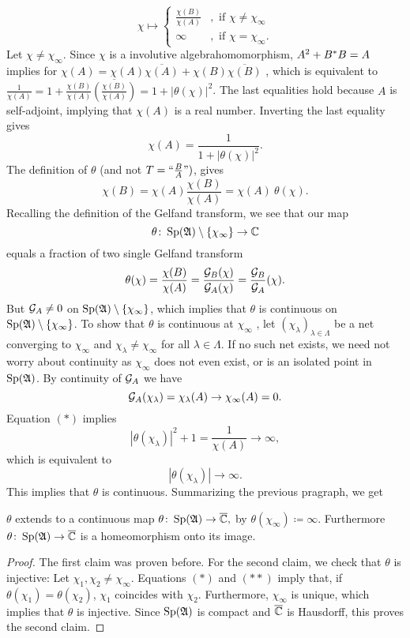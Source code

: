  \[
 \chi \mapsto 
  \begin{cases}
    \frac{\chi(B)}{\chi(A)} &, \text{ if }\chi \neq \chi_\infty\\
    \infty &, \text{ if } \chi = \chi_\infty.
    \end{cases}
 \]
 Let $\chi \neq \chi_\infty$. Since $\chi$ is a involutive algebrahomomorphism,
 $A^2 + B^{*} B = A$ implies for
   $\chi(A) = \chi(A) \overline{\chi(A)} + \chi(B) \overline{\chi(B)} $
, which is equivalent to  
  $ \frac{1}{\chi(A)} = 1 + \frac{\chi(B)}{\chi(A)} 
  \overline{\left( \frac{\chi(B)}{\chi(A)} \right)} = 1 + | \theta(\chi)|^2$.
 The last equalities hold because $A$ is self-adjoint, implying that $\chi(A)$ is a real number.
 Inverting the last equality gives
\[
 \chi(A) = \frac{1}{1 + |\theta (\chi)|^2} \tag{$\ast$}.
\]
The definition of $\theta$ (and not  $T = 
`` \frac{B}{A} ")$, gives
\[
 \chi(B) = \chi(A) \frac{\chi(B)}{\chi(A)}= \chi(A)~ \theta(\chi) 
 \tag{$\ast \ast$}.
\]
Recalling the definition of the Gelfand transform, we see that our map
\[
 \theta \colon \operatorname{Sp}(\mathfrak{A}) \setminus \left\lbrace\chi_\infty\right\rbrace \to \mathbb{C}
\]
equals a fraction of two single Gelfand transform
\[
 \theta(\chi) = \frac{\chi(B)}{\chi(A)} = \frac{\mathcal{G}_B (\chi)}{\mathcal{G}_A (\chi)}=
 \frac{\mathcal{G}_B}{\mathcal{G}_A}(\chi).
\]
But $\mathcal{G}_A \neq 0$ on $\operatorname{Sp}(\mathfrak{A}) \setminus \left\lbrace\chi_\infty\right\rbrace$, which implies
that $\theta$ is continuous on $\operatorname{Sp}(\mathfrak{A}) \setminus \left\lbrace\chi_\infty\right\rbrace$. 
To show that $\theta$ is continuous at $\chi_\infty$
, let $ \left( \chi_\lambda \right) 
_{\lambda \in \Lambda}$ be a net converging to $\chi_\infty$ and 
$\chi_\lambda \neq \chi_\infty$ for all $\lambda \in \Lambda$. If 
no such net exists, we need not worry about continuity as $\chi_\infty$
does not even exist, or is an isolated point in $\operatorname{Sp}(\mathfrak{A})$.
By continuity of $\mathcal{G}_A$ we have
\[
 \mathcal{G}_A (\chi_\lambda) = \chi_\lambda (A) \to \chi_\infty (A) = 0.
\]
Equation $(\ast)$ implies
\[
 | \theta( \chi_\lambda ) | ^2  + 1 = \frac{1}{\chi(A)} \to \infty,
\]
which is equivalent to 
\[
 | \theta (\chi_\lambda ) | \to \infty.
\]
This implies that $\theta$ is continuous. 
Summarizing the previous pragraph, we get 
\begin{lem}
$\theta$ extends to a continuous map $ \theta \colon \operatorname{Sp}(\mathfrak{A}) \to {\overline{\mathbb{C}}},$
by $\theta (\chi_\infty) \coloneqq \infty$.
Furthermore $\theta \colon \operatorname{Sp} (\mathfrak{A}) \to {\overline{\mathbb{C}}}$ is a homeomorphism onto its image.
\end{lem}

\begin{proof}
The first claim was proven before. For the second claim, we check 
that $\theta$ is injective:
Let $\chi_1 , \chi_2 \neq \chi_\infty$. Equations $(\ast)$ and $(\ast \ast)$
imply that, if $\theta (\chi_1)= \theta( \chi_2)$, \newline $\chi_1$ coincides with
$\chi_2$. Furthermore, $\chi_\infty$ is unique, which implies that $\theta$
is injective. Since $\operatorname{Sp} (\mathfrak{A})$ is compact and ${\overline{\mathbb{C}}}$ is Hausdorff, 
this proves the second claim.
\end{proof}

